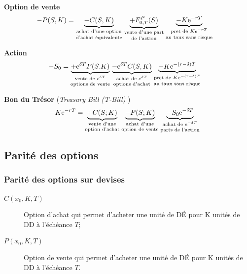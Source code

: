 \documentclass[10pt, french]{article}
\begin{document}
\begin{multicols*}{2}
\textbf{Option de vente}
\begin{align*}
	-P(S, K)	
	&=	\underset{\text{\shortstack{achat d'une option\\ d'achat équivalente}}}{\underbrace{-C(S, K)}} \;
		\underset{\text{\shortstack{vente d'une part\\ de l'action}}}{\underbrace{+F_{0, T}^{P}(S)}} \;
		\underset{\text{\shortstack{pret de $Ke^{-rT}$\\ au taux sans risque}}}{\underbrace{-K\textrm{e}^{-rT}}}
\end{align*}

\textbf{Action}
\begin{align*}
	-S_{0}
	&=	\underset{\text{\shortstack{vente de $e^{\delta T}$\\ options de vente}}}{\underbrace{+\textrm{e}^{\delta T} P(S. K)}} \;
		\underset{\text{\shortstack{achat de $e^{\delta T}$\\ options d'achat}}}{\underbrace{-\textrm{e}^{\delta T} C(S, K)}} \;
		\underset{\text{\shortstack{pret de $Ke^{-(r - \delta)T}$\\ au taux sans risque}}}{\underbrace{-K\textrm{e}^{-(r - \delta)T}}}
\end{align*}

\textbf{Bon du Trésor} (\og \textit{Treasury Bill (T-Bill)} \fg{})
\begin{align*}
	-K \textrm{e}^{-r T}
	&=	\underset{\text{\shortstack{vente d'une\\ option d'achat}}}{\underbrace{+C(S; K)}} \;
		\underset{\text{\shortstack{achat d'une\\ option de vente}}}{\underbrace{-P(S; K)}} \;
		\underset{\text{\shortstack{achat de $e^{-\delta T}$\\ parts de l'action}}}{\underbrace{-S_{0}\textrm{e}^{-\delta T}}}
\end{align*}

\columnbreak
\subsection{Parité des options}

\subsubsection*{Parité des options sur devises}
\begin{description}
	\item[$C(x_0, K, T)$]	Option d'achat qui permet d'acheter une unité de DÉ pour K unités de DD à l'échéance $T$;
	\item[$P(x_0, K, T)$] 	Option de vente qui permet d'acheter une unité de DÉ pour K unités de DD à l'échéance $T$.
\end{description}


\end{multicols*}
\end{document}

